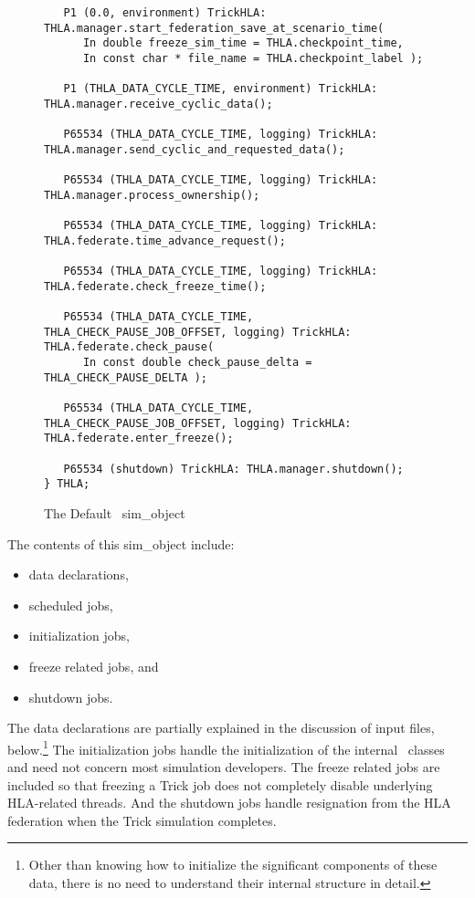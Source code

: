 \begin{figure}[th]
\begin{center}
\begin{verbatim}
   P1 (0.0, environment) TrickHLA: THLA.manager.start_federation_save_at_scenario_time(
      In double freeze_sim_time = THLA.checkpoint_time,
      In const char * file_name = THLA.checkpoint_label );

   P1 (THLA_DATA_CYCLE_TIME, environment) TrickHLA: THLA.manager.receive_cyclic_data();

   P65534 (THLA_DATA_CYCLE_TIME, logging) TrickHLA: THLA.manager.send_cyclic_and_requested_data();

   P65534 (THLA_DATA_CYCLE_TIME, logging) TrickHLA: THLA.manager.process_ownership();

   P65534 (THLA_DATA_CYCLE_TIME, logging) TrickHLA: THLA.federate.time_advance_request();

   P65534 (THLA_DATA_CYCLE_TIME, logging) TrickHLA: THLA.federate.check_freeze_time();

   P65534 (THLA_DATA_CYCLE_TIME, THLA_CHECK_PAUSE_JOB_OFFSET, logging) TrickHLA: THLA.federate.check_pause( 
      In const double check_pause_delta = THLA_CHECK_PAUSE_DELTA );

   P65534 (THLA_DATA_CYCLE_TIME, THLA_CHECK_PAUSE_JOB_OFFSET, logging) TrickHLA: THLA.federate.enter_freeze();

   P65534 (shutdown) TrickHLA: THLA.manager.shutdown();
} THLA;
    \end{verbatim}
  \end{center}
\caption{The Default \TrickHLA\ {\ttfamily sim\_object}}
\label{fig:default-sim-object}
\end{figure}

The contents of this {\ttfamily sim\_object} include:
\begin{itemize}
  \item{data declarations,}
  \item{scheduled jobs,}
  \item{initialization jobs,}
  \item{freeze related jobs, and}
  \item{shutdown jobs.}
\end{itemize}

The data declarations are partially explained in the discussion of
input files, below.\footnote{
Other than knowing how to initialize the significant components of these data,
there is no need to understand their internal structure in detail.
}
The initialization jobs handle the initialization of the internal \TrickHLA\
classes and need not concern most simulation developers.
The freeze related jobs are included so that freezing a Trick job does not
completely disable underlying HLA-related threads.
And the shutdown jobs handle resignation from the HLA federation when the
Trick simulation completes.

